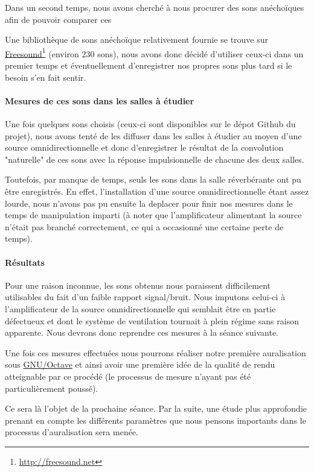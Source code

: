 \documentclass[12pt]{article}
\begin{document}
Dans un second temps, nous avons cherché à nous procurer des sons anéchoïques afin de pouvoir comparer ces 

Une bibliothèque de sons anéchoïque relativement fournie se trouve sur \underline{Freesound}\footnote{\url{http://freesound.net}} (environ 230 sons), nous avons donc décidé d'utiliser ceux-ci dans un premier temps et éventuellement d'enregistrer nos propres sons plus tard si le besoin s'en fait sentir.

\paragraph{Mesures de ces sons dans les salles à étudier}

Une fois quelques sons choisis (ceux-ci sont disponibles sur le dépot Github du projet), nous avons tenté de les diffuser dans les salles à étudier au moyen d'une source omnidirectionnelle et donc d'enregistrer le résultat de la convolution "naturelle" de ces sons avec la réponse impulsionnelle de chacune des deux salles.

Toutefois, par manque de temps, seuls les sons dans la salle réverbérante ont pu être enregistrés. En effet, l'installation d'une source omnidirectionnelle étant assez lourde, nous n'avons pas pu ensuite la deplacer pour finir nos mesures dans le temps de manipulation imparti (à noter que l'amplificateur alimentant la source n'était pas branché correctement, ce qui a occasionné une certaine perte de temps).

\paragraph{Résultats}

Pour une raison inconnue, les sons obtenus nous paraissent difficilement utilisables du fait d'un faible rapport signal/bruit. Nous imputons celui-ci à l'amplificateur de la source omnidirectionnelle qui semblait être en partie défectueux et dont le système de ventilation tournait à plein régime sans raison apparente. Nous devrons donc reprendre ces mesures à la séance suivante.


Une fois ces mesures effectuées nous pourrons réaliser notre première auralisation sous \underline{GNU/Octave} et ainsi avoir une première idée de la qualité de rendu atteignable par ce procédé (le processus de mesure n'ayant pas été particulièrement poussé). 

Ce sera là l'objet de la prochaine séance. Par la suite, une étude plus approfondie prenant en compte les différents paramètres que nous pensons importants dans le processus d'auralisation sera menée.

\end{document}
